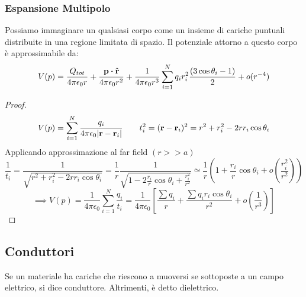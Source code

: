 \documentclass[12pt,a4paper]{article}
\begin{document}
\subsubsection{Espansione Multipolo}
Possiamo immaginare un qualsiasi corpo come un insieme di cariche puntuali distribuite in una regione limitata di spazio.
Il potenziale attorno a questo corpo è approssimabile da:
\begin{equation*}
    V(p)= \frac{Q_{tot}}{4\pi\epsilon_0 r}+ \frac{\vb{p}\vdot\vu{r}}{4\pi\epsilon_0r^2}+ \frac{1}{4\pi\epsilon_0r^3}
    \sum_{i=1}^{N} q_i r_i^2\frac{(3 \cos\theta_i-1)}{2} + o(r^{-4})
\end{equation*}
\begin{proof}
    \begin{equation*}
        V(p)= \sum_{i=1}^{N} \frac{q_i}{4\pi\epsilon_0\abs{\vb{r}-\vb{r}_i}} 
        \quad \quad t_i^2= (\vb{r}-\vb{r}_i)^2= r^2+r_i^2-2rr_i\cos \theta_i
    \end{equation*}
    Applicando approssimazione al far field $(r>>a)$
    \begin{equation*}
        \frac{1}{t_i}= \frac{1}{\sqrt{r^2+r_i^2-2rr_i\cos \theta_i}}= \frac{1}{r}\frac{1}{\sqrt{1-2\frac{r_i}{r}\cos \theta_i + \frac{r_i^2}{r^2}}}
        \simeq\frac{1}{r}\left( 1+ \frac{r_i}{r}\cos \theta_i +o(\frac{r_i^2}{r^2})\right)
    \end{equation*}
    \begin{equation*}
        \implies V(p)= \frac{1}{4\pi\epsilon_0}\sum_{i=1}^{N} \frac{q_i}{t_i}= \frac{1}{4\pi\epsilon_0} \left[ \frac{\sum q_i}{r}+\frac{\sum q_ir_i \cos \theta_i}{r^2} + o(\frac{1}{r^3})\right]
    \end{equation*}
\end{proof}

\subsection{Conduttori}
\begin{definition}
    Se un materiale ha cariche che riescono a muoversi se sottoposte a un campo elettrico, si dice conduttore. Altrimenti, è detto dielettrico.
\end{definition}
\end{document}
